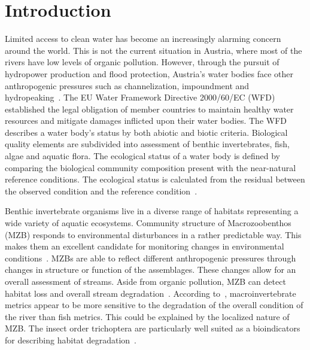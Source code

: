 

\section{Introduction}\label{sec:introduction}                                                   %

Limited access to clean water has become an increasingly alarming concern around the world. This is not the current situation in Austria, where most of the rivers have low levels of organic pollution. However, through the pursuit of hydropower production and flood protection, Austria’s water bodies face other anthropogenic pressures such as channelization, impoundment and hydropeaking~. The EU Water Framework Directive 2000/60/EC (WFD) established the legal obligation of member countries to maintain healthy water resources and mitigate damages inflicted upon their water bodies. The WFD describes a water body’s status by both abiotic and biotic criteria. Biological quality elements are subdivided into assessment of benthic invertebrates, fish, algae and aquatic flora. The ecological status of a water body is defined by comparing the biological community composition present with the near-natural reference conditions. The ecological status is calculated from the residual between the observed condition and the reference condition~.

Benthic invertebrate organisms live in a diverse range of habitats representing a wide variety of aquatic ecosystems. Community structure of Macrozoobenthos (MZB) responds to environmental disturbances in a rather predictable way. This makes them an excellent candidate for monitoring changes in environmental conditions~. MZBs are able to reflect different anthropogenic pressures through changes in structure or function of the assemblages. These changes allow for an overall assessment of streams. Aside from organic pollution, MZB can detect habitat loss and overall stream degradation~. According to~\textcite{Marzin2012}, macroinvertebrate metrics appear to be more sensitive to the degradation of the overall condition of the river than fish metrics. This could be explained by the localized nature of MZB. The insect order trichoptera are particularly well suited as a bioindicators for describing habitat degradation~.

